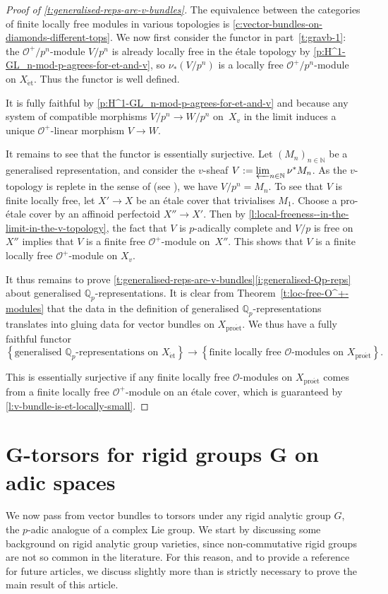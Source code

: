 \documentclass[11pt]{amsart}
\numberwithin{equation}{section}
\theoremstyle{definition}
\theoremstyle{remark}
\newcommand{\lra}{\longrightarrow}
\newcommand{\N}{\mathbb{N}}
\renewcommand{\O}{\mathcal{O}}
\newcommand{\Q}{\mathbb{Q}}
\newcommand{\et}{{\operatorname{\acute{e}t}}}
\newcommand{\proet}{{\operatorname{pro\acute{e}t}}}
\begin{document}
\begin{proof}[Proof of \cref{t:generalised-reps-are-v-bundles}]
	The equivalence between the categories of finite locally free modules in various topologies is \cref{c:vector-bundles-on-diamonds-different-tops}.
	We now first consider the functor in part~\eqref{t:gravb-1}:
	 the $\O^+/p^n$-module $V/p^n$ is already locally free in the \'etale topology by \cref{p:H^1-GL_n-mod-p-agrees-for-et-and-v}, so  $\nu_{\ast}(V/p^n)$ is a locally free $\O^+/p^n$-module on $X_{\et}$. Thus the functor is well defined.
	
	It is fully faithful by \cref{p:H^1-GL_n-mod-p-agrees-for-et-and-v} and because any system of compatible morphisms $V/p^n\to W/p^n$ on~$X_v$ in the limit induces a unique $\O^+$-linear morphism $V\to W$. 
	
	It remains to see that the functor is essentially surjective. Let $(M_n)_{n\in\N}$ be a generalised representation, and consider the $v$-sheaf $V:=\varprojlim_{n\in\N} \nu^{\ast}M_n$. As the $v$-topology is replete in the sense of \cite[Section~3.1]{bhatt-scholze-proetale} (see \cite[Lemma~2.6]{heuer-Picard-good-reduction}), we have $V/p^n=M_n$. To see that $V$ is finite locally free, let $X'\to X$ be an \'etale cover that trivialises $M_1$. Choose a pro-\'etale cover by an affinoid perfectoid $X''\to X'$. Then by \cref{l:local-freeness--in-the-limit-in-the-v-topology}, the fact that $V$ is $p$-adically complete and $V/p$ is free on $X''$ implies that $V$ is a finite free $\O^+$-module on~$X''$. This shows that $V$ is a finite locally free $\O^+$-module on $X_v$.
		
	\medskip
	
	It thus remains to prove \cref{t:generalised-reps-are-v-bundles}\eqref{i:generalised-Qp-reps} about generalised $\Q_p$-representations.
	It is clear from Theorem~\ref{t:loc-free-O^+-modules} that the data in the definition of generalised $\Q_p$-representations translates into gluing data for vector bundles on $X_{\proet}$. We thus have a fully faithful functor 
	\[\left\{ \text{generalised $\Q_p$-representations on $X_{\et}$}\right\}\lra \left\{ \text{finite locally free $\O$-modules on $X_{\proet}$}\right\}.\]
	
	This is essentially surjective if any finite locally free $\O$-modules on $X_{\proet}$ comes from a finite locally free $\O^+$-module on an \'etale cover, which is guaranteed by \cref{l:v-bundle-is-et-locally-small}.
\end{proof}


\section{\texorpdfstring{$\boldsymbol{G}$}{G}-torsors for rigid groups \texorpdfstring{$\boldsymbol{G}$}{G} on adic spaces}
We now pass from vector bundles to torsors under any rigid analytic group $G$, the $p$-adic analogue of a complex Lie group. We start by discussing some background on rigid analytic group varieties, since non-commutative rigid groups are not so common in the literature. For this reason, and to provide a reference for future articles, we discuss slightly more than is strictly necessary to prove the main result of this article.
\medskip
\end{document}
